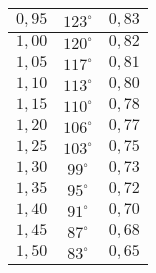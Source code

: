 \begin{table}[]
\begin{tabular}{|c|c|c|}
$0,95$                   & $123^\circ$                                                                      & $0,83$                                                                                      \\ \hline
$1,00$                   & $120^\circ$                                                                      & $0,82$                                                                                      \\ \hline
$1,05$                   & $117^\circ$                                                                      & $0,81$                                                                                      \\ \hline
$1,10$                   & $113^\circ$                                                                      & $0,80$                                                                                      \\ \hline
$1,15$                   & $110^\circ$                                                                      & $0,78$                                                                                      \\ \hline
$1,20$                   & $106^\circ$                                                                      & $0,77$                                                                                      \\ \hline
$1,25$                   & $103^\circ$                                                                      & $0,75$                                                                                      \\ \hline
$1,30$                   & $99^\circ$                                                                       & $0,73$                                                                                      \\ \hline
$1,35$                   & $95^\circ$                                                                       & $0,72$                                                                                      \\ \hline
$1,40$                   & $91^\circ$                                                                       & $0,70$                                                                                      \\ \hline
$1,45$                   & $87^\circ$                                                                       & $0,68$                                                                                      \\ \hline
$1,50$                   & $83^\circ$                                                                       & $0,65$                                                                                      \\ \hline
\end{tabular}
\end{table}